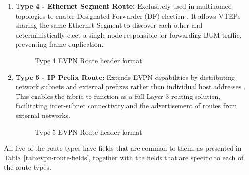\begin{enumerate}
\item \textbf{Type 4 - Ethernet Segment Route:}
Exclusively used in multihomed topologies to enable Designated Forwarder (DF) election \cite{IETFRFC7432}. It allows VTEPs sharing the same Ethernet Segment to discover each other and deterministically elect a single node responsible for forwarding BUM traffic, preventing frame duplication.
\begin{figure}[!htbp]
    \centering
    \typefour
    \caption{Type 4 EVPN Route header format}
    \label{fig:type4-evpn}
\end{figure}

\item \textbf{Type 5 - IP Prefix Route:}
Extends EVPN capabilities by distributing network subnets and external prefixes rather than individual host addresses \cite{EVPNType5}. This enables the fabric to function as a full Layer 3 routing solution, facilitating inter-subnet connectivity and the advertisement of routes from external networks.
\begin{figure}[!htbp]
    \centering
    \typefive
    \caption{Type 5 EVPN Route header format}
    \label{fig:type5-evpn}
\end{figure}
\end{enumerate}

All five of the route types have fields that are common to them, as presented in Table~\ref{tab:evpn-route-fields}, together with the fields that are specific to each of the route types.

